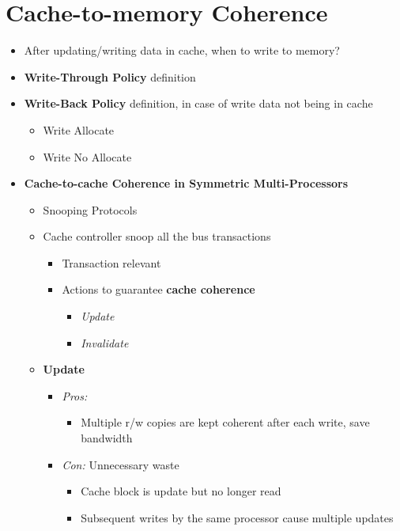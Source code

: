 \documentclass[12pt,oneside]{report}
\begin{document}
\section{Cache-to-memory Coherence}
\begin{itemize}
    \item After updating/writing data in cache, when to write to memory?
    \item \textbf{Write-Through Policy} definition
    \item \textbf{Write-Back Policy} definition, in case of write data not being in cache
    \begin{itemize}
        \item Write Allocate
        \item Write No Allocate
    \end{itemize}
    \item \textbf{Cache-to-cache Coherence in Symmetric Multi-Processors}
    \begin{itemize}
        \item Snooping Protocols
        \item Cache controller snoop all the bus transactions
        \begin{itemize}
            \item Transaction relevant
            \item Actions to guarantee \textbf{cache coherence}
            \begin{itemize}
                \item \textit{Update}
                \item \textit{Invalidate}
            \end{itemize}
        \end{itemize}
        \item \textbf{Update}
        \begin{itemize}
            \item \textit{Pros:}
            \begin{itemize}
                \item Multiple r/w copies are kept coherent after each write, save bandwidth
            \end{itemize}
            \item \textit{Con:} Unnecessary waste
            \begin{itemize}
                \item Cache block is update but no longer read
                \item Subsequent writes by the same processor cause multiple updates

\end{itemize}
\end{itemize}
\end{itemize}
\end{itemize}
\end{document}
